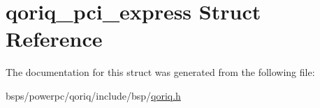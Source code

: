 \hypertarget{structqoriq__pci__express}{}\section{qoriq\+\_\+pci\+\_\+express Struct Reference}
\label{structqoriq__pci__express}


The documentation for this struct was generated from the following file\+:\begin{DoxyCompactItemize}
\item 
bsps/powerpc/qoriq/include/bsp/\mbox{\hyperlink{qoriq_8h}{qoriq.\+h}}\end{DoxyCompactItemize}
